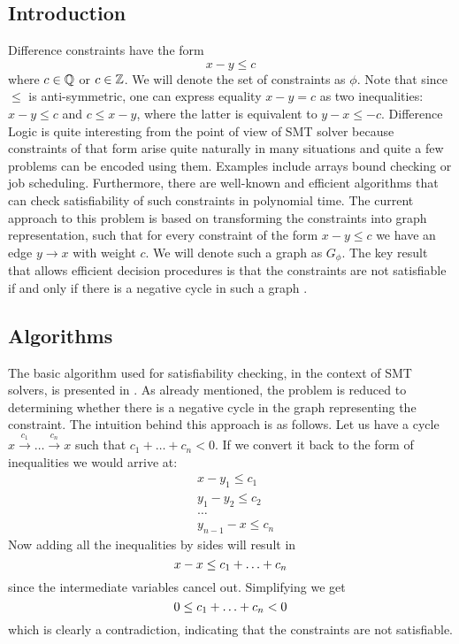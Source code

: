 \subsection{Introduction}

Difference constraints have the form
\[
x - y \leq c
\]
where $c \in \mathbb{Q}$ or $c \in \mathbb{Z}$. We will denote the set of
constraints as $\phi$. Note that since $\leq$ is anti-symmetric, one can express
equality $x - y = c$ as two inequalities: $x - y \leq c$ and $c \leq x - y$,
where the latter is equivalent to $y -x \leq -c$. Difference Logic is quite
interesting from the point of view of SMT solver because constraints of that
form arise quite naturally in many situations and quite a few problems can be
encoded using them. Examples include arrays bound checking or job scheduling.
Furthermore, there are well-known and efficient algorithms that can check
satisfiability of such constraints in polynomial time. The current approach to
this problem is based on transforming the constraints into graph representation,
such that for every constraint of the form $x - y \leq c$ we have an edge $y
\rightarrow x$ with weight $c$. We will denote such a graph as $G_\phi$. The key
result that allows efficient decision procedures is that the constraints are not
satisfiable if and only if there is a negative cycle in such a graph
\cite{bib:algorithms}.


\subsection{Algorithms}

The basic algorithm used for satisfiability checking, in the context of SMT
solvers, is presented in \cite{bib:ms_dl}. As already mentioned, the problem is
reduced to determining whether there is a negative cycle in the graph
representing the constraint. The intuition behind this approach is as follows.
Let us have a cycle
$x \xrightarrow{c_1} \ldots \xrightarrow{c_n} x$ such that
$c_1 + \ldots + c_n < 0$. If we convert it back to the form of inequalities we
would arrive at:
\begin{align*}
& x - y_1 \leq c_1 \\
& y_1 - y_2 \leq c_2 \\
& \ldots \\
& y_{n-1} - x \leq c_n
\end{align*}
Now adding all the inequalities by sides will result in
\[
x - x \leq c_1 + \ldots + c_n \\
\]
since the intermediate variables cancel out. Simplifying we get
\[
0 \leq c_1 + \ldots + c_n < 0 \\
\]
which is clearly a contradiction, indicating that the constraints are not
satisfiable.

